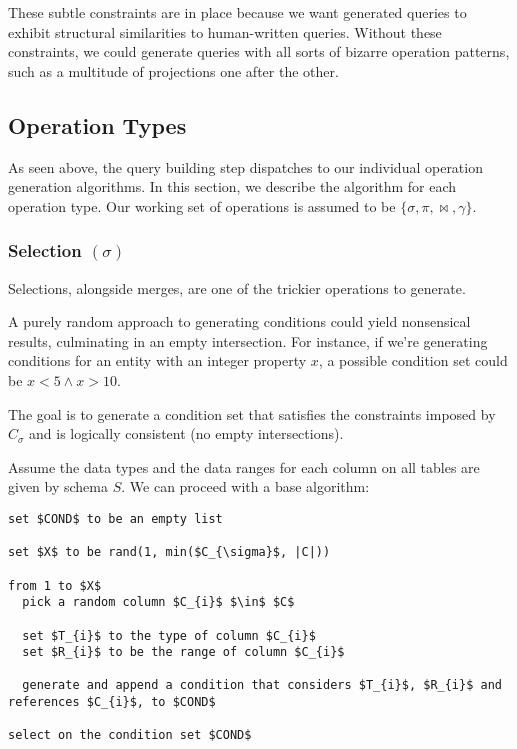 \documentclass[10pt, twocolumn]{article}
\begin{document}
\noindent
These subtle constraints are in place because we want generated queries to exhibit structural similarities to human-written queries. Without these constraints, we could generate queries with all sorts of bizarre operation patterns, such as a multitude of projections one after the other.

\subsection*{Operation Types}

As seen above, the query building step dispatches to our individual operation generation algorithms. In this section, we describe the algorithm for each operation type. Our working set of operations is assumed to be $\{\sigma, \pi, \bowtie, \gamma\}$.

\subsubsection*{Selection $(\sigma)$}

Selections, alongside merges, are one of the trickier operations to generate.

\spacing
\noindent
A purely random approach to generating conditions could yield nonsensical results, culminating in an empty intersection. For instance, if we're generating conditions for an entity with an integer property $x$, a possible condition set could be $x < 5 \land x > 10$.

\spacing
\noindent
The goal is to generate a condition set that satisfies the constraints imposed by $C_{\sigma}$ and is logically consistent (no empty intersections).

\spacing
\noindent
Assume the data types and the data ranges for each column on all tables are given by schema $S$. We can proceed with a base algorithm:

\spacing
\begin{lstlisting}
set $COND$ to be an empty list

set $X$ to be rand(1, min($C_{\sigma}$, |C|))

from 1 to $X$
  pick a random column $C_{i}$ $\in$ $C$

  set $T_{i}$ to the type of column $C_{i}$
  set $R_{i}$ to be the range of column $C_{i}$

  generate and append a condition that considers $T_{i}$, $R_{i}$ and references $C_{i}$, to $COND$

select on the condition set $COND$
\end{lstlisting}
\end{document}
